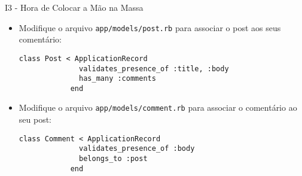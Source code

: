 \begin{frame}{I3 - Hora de Colocar a Mão na Massa}
	\begin{itemize}
		\item Modifique o arquivo \verb|app/models/post.rb| para associar 
		o post aos seus comentário:
		\begin{lstlisting}[style=RubyInputStyle]
			class Post < ApplicationRecord
			  validates_presence_of :title, :body
			  has_many :comments
			end
		\end{lstlisting}
		
		\item Modifique o arquivo \verb|app/models/comment.rb| para associar 
		o comentário ao seu post:
		\begin{lstlisting}[style=RubyInputStyle]
			class Comment < ApplicationRecord
			  validates_presence_of :body
			  belongs_to :post
			end
		\end{lstlisting}
		
		
		
		
		
					
	\end{itemize}
\end{frame}